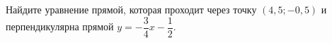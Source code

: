 \begin{ex}
	\begin{condition}
		Найдите уравнение прямой, которая проходит через точку \( (4,5;-0,5) \) и перпендикулярна прямой \( y=-\dfrac{3}{4}x-\dfrac{1}{2} \).
	\end{condition}
\end{ex}